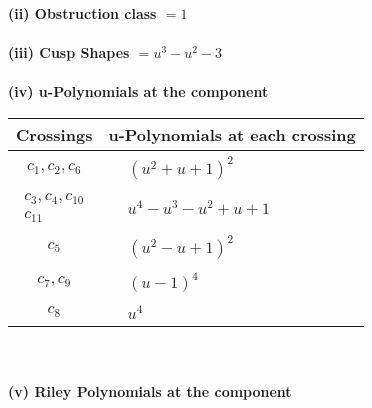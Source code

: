 \documentclass[1p]{elsarticle_modified}
\theoremstyle{definition}
\begin{document}
\flushleft \textbf{(ii) Obstruction class $= 1$}\\~\\
\flushleft \textbf{(iii) Cusp Shapes $= u^3- u^2-3$}\\~\\
\newpage\renewcommand{\arraystretch}{1}
\flushleft \textbf{(iv) u-Polynomials at the component}\newline \\
\begin{tabular}{m{50pt}|m{274pt}}
Crossings & \hspace{64pt}u-Polynomials at each crossing \\
\hline $$\begin{aligned}c_{1},c_{2},c_{6}\end{aligned}$$&$\begin{aligned}
&(u^2+u+1)^2
\end{aligned}$\\
\hline $$\begin{aligned}c_{3},c_{4},c_{10}\\c_{11}\end{aligned}$$&$\begin{aligned}
&u^4- u^3- u^2+u+1
\end{aligned}$\\
\hline $$\begin{aligned}c_{5}\end{aligned}$$&$\begin{aligned}
&(u^2- u+1)^2
\end{aligned}$\\
\hline $$\begin{aligned}c_{7},c_{9}\end{aligned}$$&$\begin{aligned}
&(u-1)^4
\end{aligned}$\\
\hline $$\begin{aligned}c_{8}\end{aligned}$$&$\begin{aligned}
&u^4
\end{aligned}$\\
\hline
\end{tabular}\\~\\
\newpage\renewcommand{\arraystretch}{1}
\flushleft \textbf{(v) Riley Polynomials at the component}\newline \\
\end{document}
